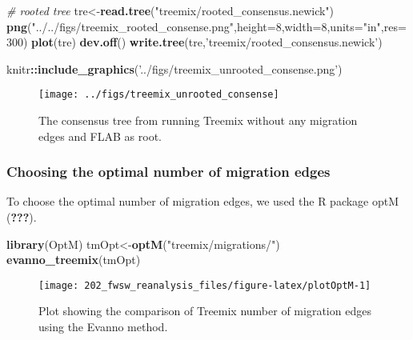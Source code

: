 \documentclass[11pt,]{article}
\newenvironment{Shaded}{\begin{snugshade}}{\end{snugshade}}
\newcommand{\KeywordTok}[1]{\textcolor[rgb]{0.13,0.29,0.53}{\textbf{#1}}}
\newcommand{\DataTypeTok}[1]{\textcolor[rgb]{0.13,0.29,0.53}{#1}}
\newcommand{\DecValTok}[1]{\textcolor[rgb]{0.00,0.00,0.81}{#1}}
\newcommand{\StringTok}[1]{\textcolor[rgb]{0.31,0.60,0.02}{#1}}
\newcommand{\CommentTok}[1]{\textcolor[rgb]{0.56,0.35,0.01}{\textit{#1}}}
\newcommand{\OperatorTok}[1]{\textcolor[rgb]{0.81,0.36,0.00}{\textbf{#1}}}
\newcommand{\NormalTok}[1]{#1}
\begin{document}
\begin{Shaded}
\begin{Highlighting}[]
\CommentTok{# rooted tree}
\NormalTok{tre<-}\KeywordTok{read.tree}\NormalTok{(}\StringTok{"treemix/rooted_consensus.newick"}\NormalTok{)}
\KeywordTok{png}\NormalTok{(}\StringTok{"../../figs/treemix_rooted_consense.png"}\NormalTok{,}\DataTypeTok{height=}\DecValTok{8}\NormalTok{,}\DataTypeTok{width=}\DecValTok{8}\NormalTok{,}\DataTypeTok{units=}\StringTok{"in"}\NormalTok{,}\DataTypeTok{res=}\DecValTok{300}\NormalTok{)}
\KeywordTok{plot}\NormalTok{(tre)}
\KeywordTok{dev.off}\NormalTok{()}
\KeywordTok{write.tree}\NormalTok{(tre,}\StringTok{'treemix/rooted_consensus.newick'}\NormalTok{)}
\end{Highlighting}
\end{Shaded}

\begin{Shaded}
\begin{Highlighting}[]
\NormalTok{knitr}\OperatorTok{::}\KeywordTok{include_graphics}\NormalTok{(}\StringTok{'../figs/treemix_unrooted_consense.png'}\NormalTok{)}
\end{Highlighting}
\end{Shaded}

\begin{figure}[H]
\texttt{[image: ../figs/treemix\_unrooted\_consense]} \caption{The consensus tree from running Treemix without any migration edges and FLAB as root.}\label{fig:treemixRooted}
\end{figure}

\subsubsection{Choosing the optimal number of migration
edges}\label{choosing-the-optimal-number-of-migration-edges}

To choose the optimal number of migration edges, we used the R package
optM ({\textbf{???}}).

\begin{Shaded}
\begin{Highlighting}[]
\KeywordTok{library}\NormalTok{(OptM)}
\NormalTok{tmOpt<-}\KeywordTok{optM}\NormalTok{(}\StringTok{"treemix/migrations/"}\NormalTok{)}
\KeywordTok{evanno_treemix}\NormalTok{(tmOpt)}
\end{Highlighting}
\end{Shaded}

\begin{figure}[H]
\texttt{[image: 202\_fwsw\_reanalysis\_files/figure-latex/plotOptM-1]} \caption{Plot showing the comparison of Treemix number of migration edges using the Evanno method.}\label{fig:plotOptM}
\end{figure}
\end{document}
